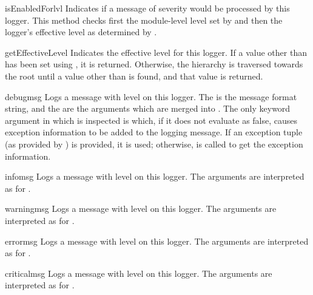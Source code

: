 \begin{methoddesc}{isEnabledFor}{lvl}
Indicates if a message of severity  would be processed by
this logger.  This method checks first the module-level level set by
 and then the logger's effective level as
determined by .
\end{methoddesc}

\begin{methoddesc}{getEffectiveLevel}{}
Indicates the effective level for this logger. If a value other than
 has been set using , it is returned.
Otherwise, the hierarchy is traversed towards the root until a value
other than  is found, and that value is returned.
\end{methoddesc}

\begin{methoddesc}{debug}{msg}
Logs a message with level  on this logger.
The  is the message format string, and the  are the
arguments which are merged into . The only keyword argument in
 which is inspected is  which, if it does not
evaluate as false, causes exception information to be added to the logging
message. If an exception tuple (as provided by )
is provided, it is used; otherwise,  is called
to get the exception information.
\end{methoddesc}

\begin{methoddesc}{info}{msg}
Logs a message with level  on this logger.
The arguments are interpreted as for .
\end{methoddesc}

\begin{methoddesc}{warning}{msg}
Logs a message with level  on this logger.
The arguments are interpreted as for .
\end{methoddesc}

\begin{methoddesc}{error}{msg}
Logs a message with level  on this logger.
The arguments are interpreted as for .
\end{methoddesc}

\begin{methoddesc}{critical}{msg}
Logs a message with level  on this logger.
The arguments are interpreted as for .
\end{methoddesc}

